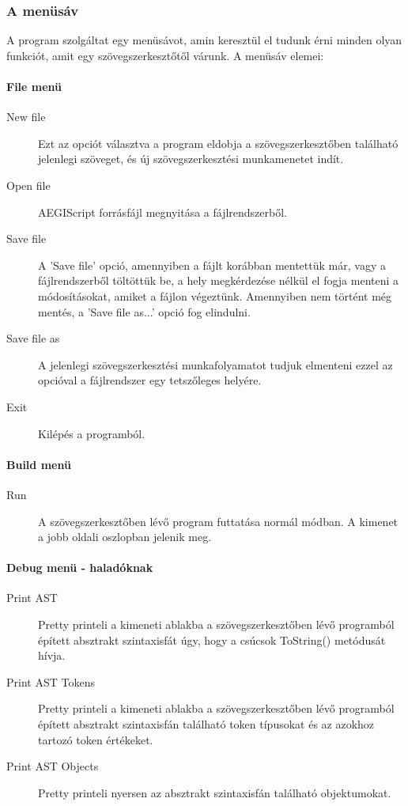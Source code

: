 \documentclass[a4paper,12pt]{report}
\begin{document}
\subsubsection{A menüsáv}
A program szolgáltat egy menüsávot, amin keresztül el tudunk érni minden olyan funkciót, amit egy szövegszerkesztőtől várunk. A menüsáv elemei: \\
\paragraph{File menü}
\begin{description}
\item[New file] Ezt az opciót választva a program eldobja a szövegszerkesztőben található jelenlegi szöveget, és új szövegszerkesztési munkamenetet indít.
\item[Open file] AEGIScript forrásfájl megnyitása a fájlrendszerből.
\item[Save file] A 'Save file' opció, amennyiben a fájlt korábban mentettük már, vagy a fájlrendszerből töltöttük be, a hely megkérdezése nélkül el fogja menteni a módosításokat, amiket a fájlon végeztünk. Amennyiben nem történt még mentés, a 'Save file as...' opció fog elindulni.
\item[Save file as] A jelenlegi szövegszerkesztési munkafolyamatot tudjuk elmenteni ezzel az opcióval a fájlrendszer egy tetszőleges helyére.
\item[Exit] Kilépés a programból.
\end{description}

\paragraph{Build menü}
\begin{description}
\item[Run] A szövegszerkesztőben lévő program futtatása normál módban. A kimenet a jobb oldali oszlopban jelenik meg.
\end{description} 

\paragraph{Debug menü - haladóknak} 
\begin{description}
\item[Print AST] Pretty printeli a kimeneti ablakba a szövegszerkesztőben lévő programból épített absztrakt szintaxisfát úgy, hogy a csúcsok ToString() metódusát hívja.
\item[Print AST Tokens] Pretty printeli a kimeneti ablakba a szövegszerkesztőben lévő programból épített absztrakt szintaxisfán található token típusokat és az azokhoz tartozó token értékeket.
\item[Print AST Objects] Pretty printeli nyersen az absztrakt szintaxisfán található objektumokat.
\end{description}
\end{document}
